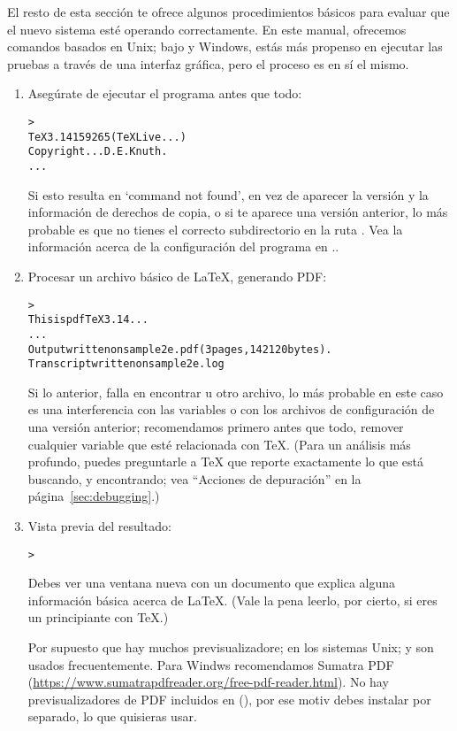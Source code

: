 \documentclass{article}
\begin{document}
El resto de esta sección te ofrece algunos procedimientos básicos para
evaluar que el nuevo sistema esté operando correctamente. En este
manual, ofrecemos comandos basados en Unix; bajo \MacOSX{} y Windows, estás
más propenso en ejecutar las pruebas a través de una interfaz gráfica,
pero el proceso es en sí el mismo. 

\begin{enumerate}
	\item Asegúrate de ejecutar el programa  antes
		que todo:
	\begin{alltt}
		> 
		TeX 3.14159265 (TeX Live ...)
		Copyright ... D.E. Knuth.
		...
	\end{alltt}
Si esto resulta en `command not found', en vez de aparecer la versión y la
información de derechos de copia, o si te aparece una versión
anterior, lo más probable es que no tienes el correcto subdirectorio
 en la ruta . Vea la información acerca de
la configuración del programa en \p.\pageref{sec:env}. 

\item Procesar un archivo básico de \LaTeX{}, generando PDF:
\begin{alltt}
	> 
	This is pdfTeX 3.14 ...
	...
	Output written on sample2e.pdf (3 pages, 142120 bytes).
	Transcript written on sample2e.log
\end{alltt}

Si lo anterior, falla en encontrar  u otro
archivo, lo más probable en este caso es una interferencia con
las variables o con los archivos de configuración de una
versión anterior; recomendamos primero antes que todo, remover
cualquier variable que esté relacionada con \TeX.  (Para un
análisis más profundo, puedes preguntarle a \TeX{} que reporte
exactamente lo que está buscando, y encontrando; vea
``Acciones de depuración'' en la página~\ref{sec:debugging}.)

\item Vista previa del resultado:
\begin{alltt}
>     
\end{alltt}
Debes ver una ventana nueva con un documento que explica alguna
información básica acerca de \LaTeX{}. (Vale la pena leerlo, por
cierto, si eres un principiante con \TeX.)

Por supuesto que hay muchos previsualizadore; en los sistemas Unix;  y  son usados frecuentemente. Para Windws recomendamos Sumatra PDF (\url{https://www.sumatrapdfreader.org/free-pdf-reader.html}). No hay previsualizadores de PDF incluidos en \TL(), por ese motiv debes instalar por separado, lo que quisieras usar.


\end{enumerate}
\end{document}
